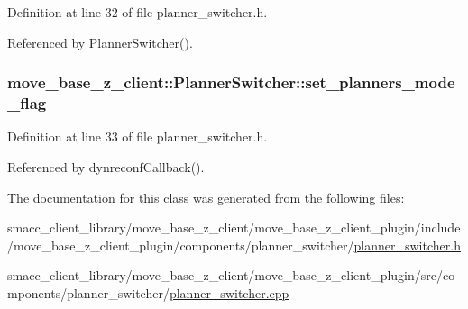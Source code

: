 Definition at line 32 of file planner\+\_\+switcher.\+h.



Referenced by Planner\+Switcher().

\subsubsection[{\texorpdfstring{set\+\_\+planners\+\_\+mode\+\_\+flag}{set_planners_mode_flag}}]{ move\+\_\+base\+\_\+z\+\_\+client\+::\+Planner\+Switcher\+::set\+\_\+planners\+\_\+mode\+\_\+flag\hspace{0.3cm}{\ttfamily [private]}}\hypertarget{classmove__base__z__client_1_1PlannerSwitcher_a74c0b5c21064a868700288e759446ac5}{}\label{classmove__base__z__client_1_1PlannerSwitcher_a74c0b5c21064a868700288e759446ac5}


Definition at line 33 of file planner\+\_\+switcher.\+h.



Referenced by dynreconf\+Callback().



The documentation for this class was generated from the following files\+:\begin{DoxyCompactItemize}
\item 
smacc\+\_\+client\+\_\+library/move\+\_\+base\+\_\+z\+\_\+client/move\+\_\+base\+\_\+z\+\_\+client\+\_\+plugin/include/move\+\_\+base\+\_\+z\+\_\+client\+\_\+plugin/components/planner\+\_\+switcher/\hyperlink{planner__switcher_8h}{planner\+\_\+switcher.\+h}\item 
smacc\+\_\+client\+\_\+library/move\+\_\+base\+\_\+z\+\_\+client/move\+\_\+base\+\_\+z\+\_\+client\+\_\+plugin/src/components/planner\+\_\+switcher/\hyperlink{planner__switcher_8cpp}{planner\+\_\+switcher.\+cpp}\end{DoxyCompactItemize}
